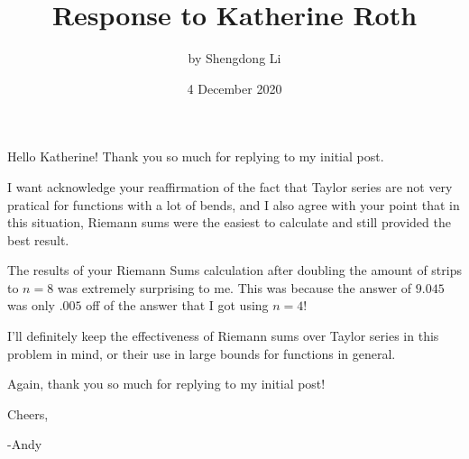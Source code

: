 \documentclass[12pt]{article}
\begin{document}
\title{Response to Katherine Roth}
\author{by Shengdong Li}
\date{4 December 2020}
\maketitle

Hello Katherine!
Thank you so much for replying to my initial post. 

I want acknowledge your reaffirmation of the fact that Taylor series are not very pratical for functions with a lot of bends, and I also agree with your point that in this situation, Riemann sums were the easiest to calculate and still provided the best result. 

The results of your Riemann Sums calculation after doubling the amount of strips to $n=8$ was extremely surprising to me. This was because the answer of $9.045$ was only $.005$ off of the answer that I got using $n=4$! 

I'll definitely keep the effectiveness of Riemann sums over Taylor series in this problem in mind, or their use in large bounds for functions in general. 

Again, thank you so much for replying to my initial post!
\bigskip

Cheers,

-Andy
\end{document}
